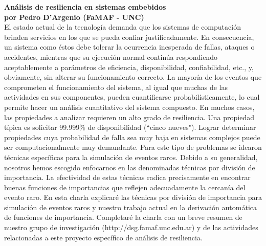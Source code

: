 \documentclass[12pt, a4paper]{article}
\newcommand{\charla}[3]{
	{\large\bf#1}\\
	{\bf por #2}\\
	#3\\
}
\begin{document}
\charla
{Análisis de resiliencia en sistemas embebidos}
{Pedro D'Argenio (FaMAF - UNC)}
{El estado actual de la tecnología demanda que los sistemas de computación brinden servicios en los que se pueda confiar justificadamente. En consecuencia, un sistema como éstos debe tolerar la ocurrencia inesperada de fallas, ataques o accidentes, mientras que su ejecución normal continúa respondiendo aceptablemente a parámetros de eficiencia, disponibilidad, confiabilidad, etc., y, obviamente, sin alterar su funcionamiento correcto. La mayoría de los eventos que comprometen el funcionamiento del sistema, al igual que muchas de las actividades en sus componentes, pueden cuantificarse probabilísticamente, lo cual permite hacer un análisis cuantitativo del sistema compuesto. En muchos casos, las propiedades a analizar requieren un alto grado de resiliencia. Una propiedad típica es solicitar 99.999\% de disponibilidad (``cinco nueves"). Lograr determinar propiedades cuya probabilidad de falla sea muy baja en sistemas complejos puede ser computacionalmente muy demandante. Para este tipo de problemas se idearon técnicas específicas para la simulación de eventos raros. Debido a su generalidad, nosotros hemos escogido enfocarnos en las denominadas técnicas por división de importancia. La efectividad de estas técnicas radica precisamente en encontrar buenas funciones de importancias que reflejen adecuadamente la cercanía del evento raro.
En esta charla explicaré las técnicas por división de importancia para simulación de eventos raros y nuestro trabajo actual en la derivación automática de funciones de importancia.
Completaré la charla con un breve resumen de nuestro grupo de investigación (http://dsg.famaf.unc.edu.ar) y de las actividades relacionadas a este proyecto específico de análisis de resiliencia.}
\end{document}
